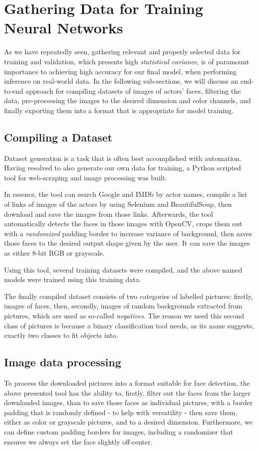\section{Gathering Data for Training Neural Networks}
As we have repeatedly seen, gathering relevant and properly selected data for training and validation, which presents high \textit{statistical variance}, is of paramount importance to achieving high accuracy for our final model, when performing inference on real-world data.  In the following sub-sections, we will discuss an end-to-end approach for compiling datasets of images of actors' faces, filtering the data, pre-processing the images to the desired dimension and color channels, and finally exporting them into a format that is appropriate for model training.
\subsection{Compiling a Dataset}
Dataset generation is a task that is often best accomplished with automation. Having resolved to also generate our own data for training, a Python scripted tool for web-scraping and image processing was built. \par
In essence, the tool can search Google and IMDb by actor names, compile a list of links of images of the actors by using Selenium \cite{selenium_website} and BeautifulSoup, then download and save the images from those links. Afterwards, the tool automatically detects the faces in those images with OpenCV, crops them out with a \textit{randomized} padding border to increase variance of background, then saves those faces to the desired output shape given by the user. It can save the images as either 8-bit RGB or grayscale. \par
Using this tool, several training datasets were compiled, and the above named models were trained using this training data.\par
The finally compiled dataset consists of two categories of labelled pictures: firstly, images of faces, then, secondly, images of random backgrounds extracted from pictures, which are used as so-called \textit{negatives}. The reason we need this second class of pictures is because a binary classification tool needs, as its name suggests, exactly two classes to fit objects into.

\subsection{Image data processing}
To process the downloaded pictures into a format suitable for face detection, the above presented tool has the ability to, firstly, filter out the faces from the larger downloaded images, than to save those faces as individual pictures, with a border padding that is randomly defined - to help with versatility - then save them, either as color or grayscale pictures, and to a desired dimension. Furthermore, we can define custom padding borders for images, including a randomizer that ensures we always set the face slightly off-center.

